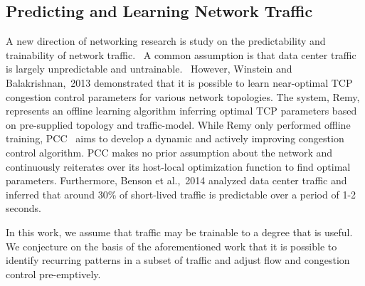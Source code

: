 \subsection{Predicting and Learning Network Traffic}
A new direction of networking research is study on the predictability and 
trainability of network traffic.~\cite{throwdown, learning_tcp}
A common assumption is that data center traffic is largely unpredictable and 
untrainable.~\cite{fb_dc}
However, Winstein and Balakrishnan,~2013\cite{remy} demonstrated that it is 
possible to learn near-optimal TCP congestion control parameters for various 
network topologies. The system, Remy, represents an offline learning algorithm 
inferring optimal TCP parameters based on pre-supplied topology and 
traffic-model.
While Remy only performed offline training, PCC~\cite{pcc,throwdown} aims to 
develop a dynamic and actively improving congestion control algorithm. PCC 
makes no prior assumption about the network and continuously reiterates over 
its host-local optimization function to find optimal parameters.
Furthermore, Benson et al.,~2014\cite{microte} analyzed data center traffic and 
inferred that around 30\% of short-lived traffic is predictable over a period 
of 1-2 seconds.

In this work, we assume that traffic may be trainable to a degree that is 
useful. We conjecture on the basis of the aforementioned work that it is 
possible to identify recurring patterns in a subset of traffic and adjust flow 
and congestion control pre-emptively.